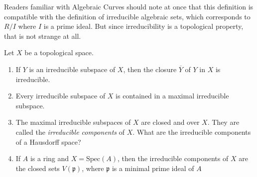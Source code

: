 \documentclass{solution}
\begin{document}
{\color{red} Readers familiar with Algebraic Curves should note at once that this definition is compatible with the definition of irreducible algebraic sets, which corresponds to $R / I$ where $I$ is a prime ideal. But since irreducibility is a topological property, that is not strange at all.}

\begin{problem}
    Let $X$ be a topological space.
    \begin{enumerate}
        \item If $Y$ is an irreducible subspace of $X$, then the closure $\overline{Y}$ of $Y$ in $X$ is irreducible.
        \item Every irreducible subspace of $X$ is contained in a maximal irreducible subspace.
        \item The maximal irreducible subspaces of $X$ are closed and over $X$. They are called the \textit{irreducible components} of $X$. What are the irreducible components of a Hausdorff space?
        \item If $A$ is a ring and $X = \mathrm{Spec}(A)$, then the irreducible components of $X$ are the closed sets $V(\mathfrak{p})$, where $\mathfrak{p}$ is a minimal prime ideal of $A$
    \end{enumerate}
\end{problem}
\end{document}
